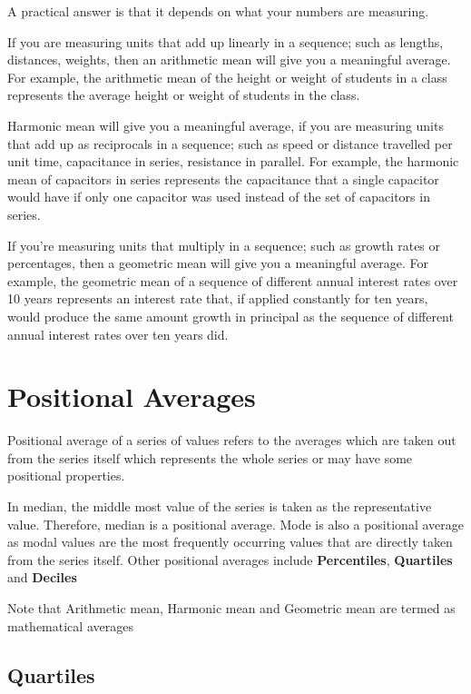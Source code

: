 \documentclass[
]{book}
\begin{document}
A practical answer is that it depends on what your numbers are
measuring.

If you are measuring units that add up linearly in a sequence; such as
lengths, distances, weights, then an arithmetic mean will give you a
meaningful average. For example, the arithmetic mean of the height or
weight of students in a class represents the average height or weight of
students in the class.

Harmonic mean will give you a meaningful average, if you are measuring
units that add up as reciprocals in a sequence; such as speed or
distance travelled per unit time, capacitance in series, resistance in
parallel. For example, the harmonic mean of capacitors in series
represents the capacitance that a single capacitor would have if only
one capacitor was used instead of the set of capacitors in series.

If you're measuring units that multiply in a sequence; such as growth
rates or percentages, then a geometric mean will give you a meaningful
average. For example, the geometric mean of a sequence of different
annual interest rates over 10 years represents an interest rate that, if
applied constantly for ten years, would produce the same amount growth
in principal as the sequence of different annual interest rates over ten
years did.

\hypertarget{positional-averages}{%
\section{Positional Averages}\label{positional-averages}}

Positional average of a series of values refers to the averages which
are taken out from the series itself which represents the whole series
or may have some positional properties.

In median, the middle most value of the series is taken as the
representative value. Therefore, median is a positional average. Mode is
also a positional average as modal values are the most frequently
occurring values that are directly taken from the series itself. Other
positional averages include \textbf{Percentiles}, \textbf{Quartiles} and
\textbf{Deciles}

Note that Arithmetic mean, Harmonic mean and Geometric mean are termed
as mathematical averages

\hypertarget{quartile}{%
\subsection{Quartiles}\label{quartile}}
\end{document}
